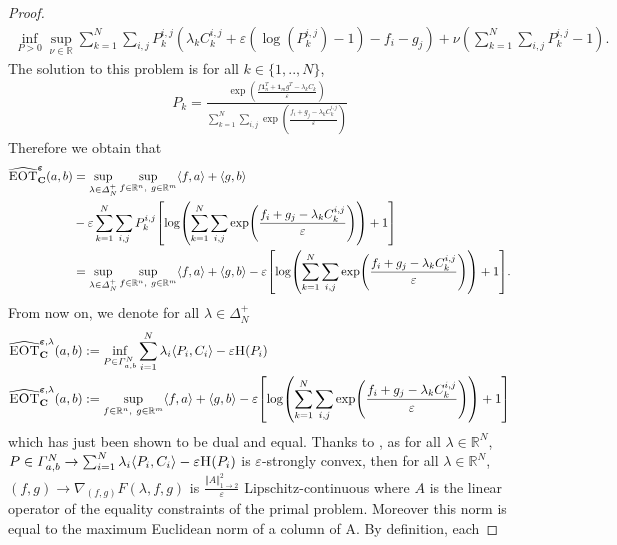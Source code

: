 \begin{proof}
\begin{align*}
\inf_{P>0}\sup_{\nu \in\mathbb{R}}
   \sum_{k=1}^N \sum_{i,j} P_k^{i,j} \left(\lambda_k C_k^{i,j} +\varepsilon\left(\log(P_k^{i,j})-1\right) -f_i - g_j \right) +\nu\left(\sum_{k=1}^N \sum_{i,j} P_k^{i,j}-1 \right).
\end{align*}
The solution to this problem is for all $k\in\{1,..,N\}$,
\begin{align*}
     P_k = \frac{\exp\left(\frac{f\mathbf{1}_n^T + \mathbf{1}_m g^T-\lambda_k C_k}{\varepsilon}\right)}{\sum_{k=1}^N \sum_{i,j} \exp\left(\frac{f_i + g_j-\lambda_k C_k^{i,j}}{\varepsilon}\right)}
\end{align*}
Therefore we obtain that 
\begin{align*}
    \widehat{\MOT}^{\bm{\varepsilon}}_{\mathbf{C}}(a,b)&=\sup_{\lambda\in\Delta_N^{+}}\sup_{f\in\mathbb{R}^n,~g\in\mathbb{R}^m} \langle f,a \rangle + \langle g, b \rangle\\
    &-  \varepsilon \sum_{k=1}^N \sum_{i,j} P_k^{i,j} \left[\log\left(\sum_{k=1}^N \sum_{i,j} \exp\left(\frac{f_i + g_j-\lambda_k C_k^{i,j}}{\varepsilon}\right)\right) + 1\right]\\
    &= \sup_{\lambda\in\Delta_N^{+}}\sup_{f\in\mathbb{R}^n,~g\in\mathbb{R}^m} \langle f,a \rangle + \langle g, b \rangle -  \varepsilon \left[\log\left(\sum_{k=1}^N \sum_{i,j} \exp\left(\frac{f_i + g_j-\lambda_k C_k^{i,j}}{\varepsilon}\right)\right) + 1\right].
\end{align*}
From now on, we denote for all $\lambda\in\Delta_N^{+}$ 
\begin{align*}
     \widehat{\MOT}^{\bm{\varepsilon},\lambda}_{\mathbf{C}}(a,b)&:= \inf_{P\in \Gamma_{a,b}^N} \sum_{i=1}^N \lambda_i \langle P_i,C_i\rangle -\varepsilon \ent(P_i) \\
      \widehat{\MOT}^{\bm{\varepsilon},\lambda}_{\mathbf{C}}(a,b)&:= \sup_{f\in\mathbb{R}^n,~g\in\mathbb{R}^m} \langle f,a \rangle + \langle g, b \rangle -  \varepsilon \left[\log\left(\sum_{k=1}^N \sum_{i,j} \exp\left(\frac{f_i + g_j-\lambda_k C_k^{i,j}}{\varepsilon}\right)\right) + 1\right] 
\end{align*}
which has just been shown to be dual and equal. Thanks to \citep[Theorem 1]{nesterov2005smooth}, as for all $\lambda\in\mathbb{R}^N$, $P\in\Gamma_{a,b}^N\rightarrow \sum_{i=1}^N \lambda_i \langle P_i,C_i\rangle -\varepsilon \textsc{H}(P_i)$ is $\varepsilon$-strongly convex, then for all $\lambda\in\mathbb{R}^N$, $(f,g)\rightarrow \nabla_{(f,g)} F(\lambda,f,g)$ is $\frac{\Vert A\Vert_{1\rightarrow 2}^2}{\varepsilon}$ Lipschitz-continuous where $A$ is the linear operator of the equality constraints of the primal problem. Moreover this norm is equal to the maximum Euclidean norm of a column of A. By definition, each

\end{proof}
